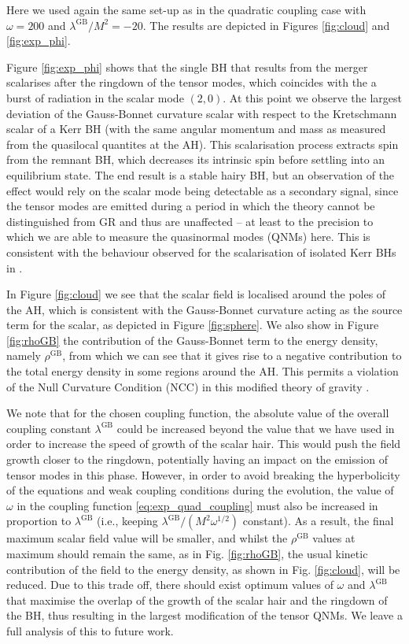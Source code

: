 \documentclass[reprint,aps,amsmath,amssymb,twoside,prd,showkeys,superscriptaddress,nofootinbib]{revtex4-2}
\begin{document}
Here we used again the same set-up as in the quadratic coupling case with $\omega=200$ and $\lambda^{\text{GB}}/M^2=-20$. The results are depicted in Figures \ref{fig:cloud} and \ref{fig:exp_phi}. 

Figure \ref{fig:exp_phi} shows that the single BH that results from the merger scalarises after the ringdown of the tensor modes, which coincides with the a burst of radiation in the scalar mode $(2,0)$. At this point we observe the largest deviation of the Gauss-Bonnet curvature scalar with respect to the Kretschmann scalar of a Kerr BH (with the same angular momentum and mass as measured from the quasilocal quantites at the AH). This scalarisation process extracts spin from the remnant  BH, which decreases its intrinsic spin before settling into an equilibrium state. The end result is a stable hairy BH, but an observation of the effect would rely on the scalar mode being detectable as a secondary signal, since the tensor modes are emitted during a period in which the theory cannot be distinguished from GR and thus are unaffected -- at least to the precision to which we are able to measure the quasinormal modes (QNMs) here. This is consistent with the behaviour observed for the scalarisation of isolated Kerr BHs in \cite{East:2021bqk}.

In Figure \ref{fig:cloud} we see that the scalar field is localised around the poles of the AH, which is consistent with  the Gauss-Bonnet curvature acting as the source term for the scalar, as depicted in Figure \ref{fig:sphere}. We also show in Figure \ref{fig:rhoGB} the contribution of the Gauss-Bonnet term to the energy density, namely $\rho^{\text{GB}}$, from which we can see that it gives rise to a negative contribution to the total energy density in some regions around the AH. This permits a violation of the Null Curvature Condition (NCC) in this modified theory of gravity \cite{R:2022hlf}.

We note that for the chosen coupling function, the absolute value of the overall coupling constant $\lambda^{\text{GB}}$ could be increased beyond the value that we have used in order to increase the speed of growth of the scalar hair. This would push the field growth closer to the ringdown, potentially having an impact on the emission of tensor modes in this phase. However, in order to avoid breaking the hyperbolicity of the equations and weak coupling conditions during the evolution, the value of $\omega$ in the coupling function \eqref{eq:exp_quad_coupling} must also be increased in proportion to $\lambda^\text{GB}$ (i.e., keeping $\lambda^\text{GB}/(M^2\omega^{1/2})$ constant). As a result, the final maximum scalar field value will be smaller, and whilst the $\rho^{\text{GB}}$ values at maximum should remain the same, as in Fig. \ref{fig:rhoGB}, the usual kinetic contribution of the field to the energy density, as shown in Fig. \ref{fig:cloud}, will be reduced.  
Due to this trade off, there should exist optimum values of $\omega$ and $\lambda^{\text{GB}}$ that maximise the overlap of the growth of  the scalar hair and the ringdown of the BH, thus resulting in the largest modification of the tensor QNMs. We leave a full analysis of this to future work.
\end{document}
